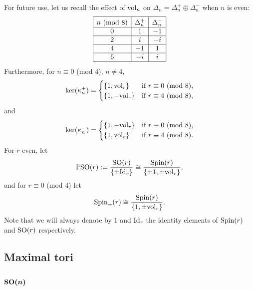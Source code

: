 \documentclass[10pt,a4paper]{amsart}
\newcommand\tstrut{\rule{0pt}{2.6ex}}
\numberwithin{equation}{section}
\begin{document}
For future use, let us recall the ef\/fect of ${\rm vol}_n$ on $\Delta_n= \Delta_n^+ \oplus \Delta_n^-$ when $n$ is even:
\begin{gather*}\begin{array}{|c|c|c|}\hline
n\,\,\text{(mod 8)} & \Delta_n^+ & \Delta_n^- \tstrut\\\hline
0 & 1 & -1\\\hline
2 & i & -i\\\hline
4 & -1 & 1\\\hline
6 & -i & i \\\hline
 \end{array}
\end{gather*}
Furthermore, for $n\equiv 0$ (mod 4), $n\not =4$,
\begin{gather*}\ker(\kappa_n^+)= \begin{cases}
\{1,{\rm vol}_r\} & \text{if $r\equiv 0$ (mod 8)},\\
\{1,-{\rm vol}_r\} & \text{if $r\equiv 4$ (mod 8)},
 \end{cases}\end{gather*}
and
\begin{gather*}\ker(\kappa_n^-)= \begin{cases}
\{1,-{\rm vol}_r\} & \text{if $r\equiv 0$ (mod 8)},\\
\{1,{\rm vol}_r\} & \text{if $r\equiv 4$ (mod 8)}.
 \end{cases}\end{gather*}
For $r$ even, let
\begin{gather*}
\mathbb{P}{\rm SO}(r):= {{\rm SO}(r)\over\{\pm {\rm Id}_r\}}\cong {{\rm Spin}(r)\over\{\pm 1,\pm{\rm vol}_r\}},
\end{gather*}
and for $r\equiv 0$ (mod 4) let
\begin{gather*}
{\rm Spin}_\pm(r) \cong {{\rm Spin}(r)\over \{1, \pm{\rm vol}_r\} }.
\end{gather*}
Note that we will always denote by $1$ and ${\rm Id}_r$ the identity elements of ${\rm Spin}(r)$ and ${\rm SO}(r)$ respectively.

\subsection{Maximal tori}

\subsubsection[${\rm SO}(n)$]{$\boldsymbol{{\rm SO}(n)}$}
\end{document}
